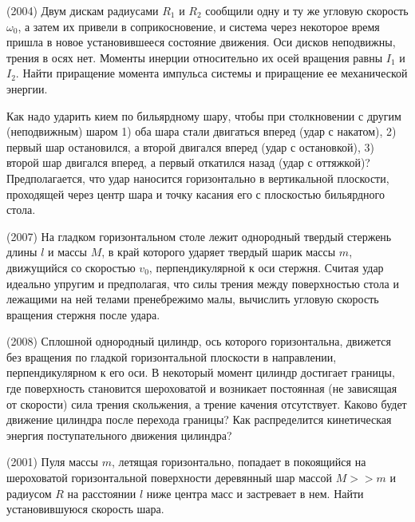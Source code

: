 \AddProb (2004) Двум дискам радиусами $R_1$ и $R_2$ сообщили одну и ту же угловую скорость $\omega_0$,
 а затем их привели в соприкосновение, и система через некоторое время пришла в новое установившееся состояние движения. 
Оси дисков неподвижны, трения в осях нет. Моменты инерции относительно их осей вращения равны $I_1$ и $I_2$. 
Найти приращение момента импульса системы и приращение ее механической энергии.

\AddProb Как надо ударить кием по бильярдному шару, чтобы при столкновении с другим (неподвижным) шаром 
1) оба шара стали двигаться вперед (удар с накатом), 2) первый шар остановился, а второй двигался вперед (удар с остановкой), 
3) второй шар двигался вперед, а первый откатился назад (удар с оттяжкой)? 
Предполагается, что удар наносится горизонтально в вертикальной плоскости, проходящей через центр шара и точку касания его с плоскостью бильярдного стола.


\AddProb (2007) На гладком горизонтальном столе лежит однородный твердый стержень длины $l$ и массы $M$, 
в край которого ударяет твердый шарик массы $m$, движущийся со скоростью $v_0$, перпендикулярной к оси стержня. 
Считая удар идеально упругим и предполагая, что силы трения между поверхностью стола и лежащими на ней телами пренебрежимо малы, 
вычислить угловую скорость вращения стержня после удара.

\AddProb (2008) Сплошной однородный цилиндр, ось которого горизонтальна, движется без вращения по гладкой горизонтальной плоскости в направлении, 
перпендикулярном к его оси. В некоторый момент цилиндр достигает границы, где поверхность становится шероховатой и возникает постоянная 
(не зависящая от скорости) сила трения скольжения, а трение качения отсутствует. Каково будет движение цилиндра после перехода границы? 
Как распределится кинетическая энергия поступательного движения цилиндра?

\AddProb (2001) Пуля массы $m$, летящая горизонтально, попадает в покоящийся на шероховатой горизонтальной поверхности деревянный шар массой 
$M >> m$  и радиусом $R$ на расстоянии $l $ ниже центра масс и застревает в нем. Найти установившуюся скорость шара.

